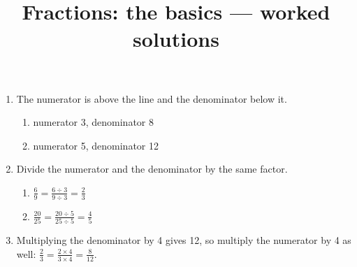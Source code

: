 \documentclass[12pt]{article}
\begin{document}

\title{Fractions: the basics --- worked solutions}
\date{}
\maketitle

\begin{enumerate}[label=\textbf{Q\arabic*.}]

\item The numerator is above the line and the denominator below it.
\begin{enumerate}[label=(\alph*)]
    \item numerator 3, denominator 8
    \item numerator 5, denominator 12
\end{enumerate}

\item Divide the numerator and the denominator by the same factor.
\begin{enumerate}[label=(\alph*)]
    \item \( \frac{6}{9} = \frac{6 \div 3}{9 \div 3} = \frac{2}{3} \)
    \item \( \frac{20}{25} = \frac{20 \div 5}{25 \div 5} = \frac{4}{5} \)
\end{enumerate}

\item Multiplying the denominator by 4 gives 12, so multiply the numerator by 4 as well:
\( \frac{2}{3} = \frac{2 \times 4}{3 \times 4} = \frac{8}{12} \).

\end{enumerate}
\end{document}
